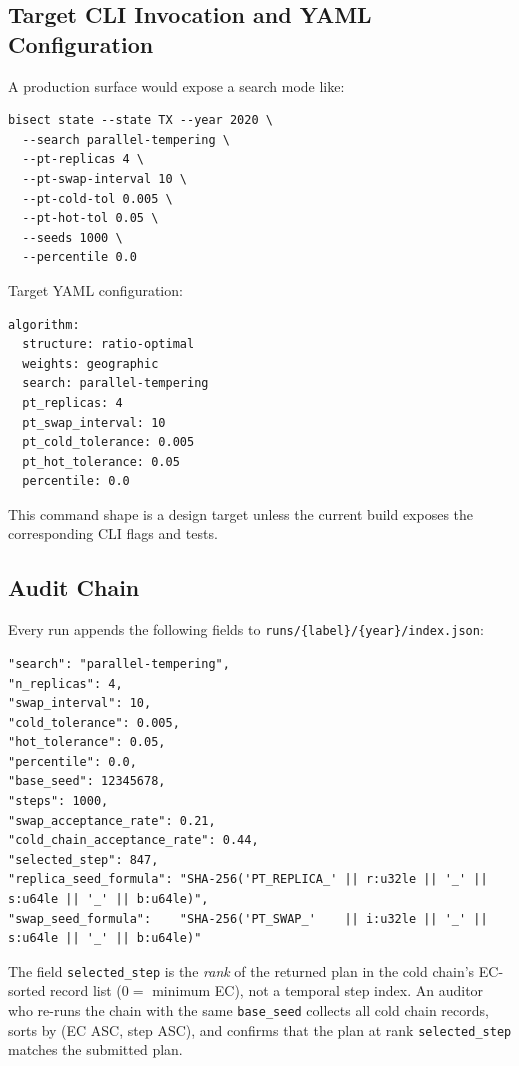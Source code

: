 \subsection{Target CLI Invocation and YAML Configuration}

A production \pt{} surface would expose a search mode like:
\begin{verbatim}
bisect state --state TX --year 2020 \
  --search parallel-tempering \
  --pt-replicas 4 \
  --pt-swap-interval 10 \
  --pt-cold-tol 0.005 \
  --pt-hot-tol 0.05 \
  --seeds 1000 \
  --percentile 0.0
\end{verbatim}

Target YAML configuration:
\begin{verbatim}
algorithm:
  structure: ratio-optimal
  weights: geographic
  search: parallel-tempering
  pt_replicas: 4
  pt_swap_interval: 10
  pt_cold_tolerance: 0.005
  pt_hot_tolerance: 0.05
  percentile: 0.0
\end{verbatim}

This command shape is a design target unless the current build exposes the
corresponding CLI flags and tests.

\subsection{Audit Chain}

Every run appends the following fields to \texttt{runs/\{label\}/\{year\}/index.json}:
\begin{verbatim}
"search": "parallel-tempering",
"n_replicas": 4,
"swap_interval": 10,
"cold_tolerance": 0.005,
"hot_tolerance": 0.05,
"percentile": 0.0,
"base_seed": 12345678,
"steps": 1000,
"swap_acceptance_rate": 0.21,
"cold_chain_acceptance_rate": 0.44,
"selected_step": 847,
"replica_seed_formula": "SHA-256('PT_REPLICA_' || r:u32le || '_' || s:u64le || '_' || b:u64le)",
"swap_seed_formula":    "SHA-256('PT_SWAP_'    || i:u32le || '_' || s:u64le || '_' || b:u64le)"
\end{verbatim}

The field \texttt{selected\_step} is the \emph{rank} of the returned plan in
the cold chain's EC-sorted record list ($0 =$ minimum EC), not a temporal step
index.
An auditor who re-runs the chain with the same \texttt{base\_seed} collects all
cold chain records, sorts by (EC ASC, step ASC), and confirms that the plan at
rank \texttt{selected\_step} matches the submitted plan.

